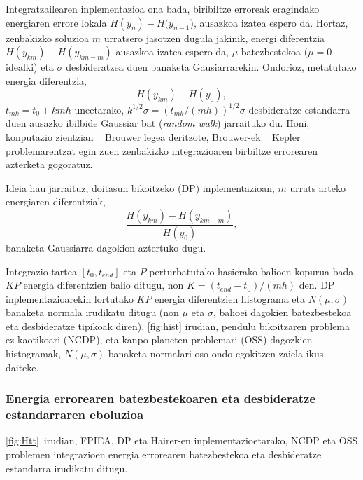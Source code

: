 Integratzailearen inplementazioa ona bada, biribiltze erroreak eragindako energiaren errore lokala $H(y_n)-H(y_{n-1}$), ausazkoa izatea espero da. Hortaz, zenbakizko soluzioa $m$ urratsero jasotzen dugula jakinik, energi diferentzia $H(y_{km})-H(y_{km-m})$ ausazkoa izatea espero da, $\mu$ batezbestekoa ($\mu=0$ idealki) eta $\sigma$ desbideratzea duen banaketa Gausiarrarekin. Ondorioz, metatutako energia diferentzia,
\begin{equation*}
H(y_{km})-H(y_0),
\end{equation*} 
$t_{mk}=t_0+kmh$ uneetarako, $k^{1/2} \sigma=(t_{mk}/(mh))^{1/2} \sigma$ desbideratze estandarra duen ausazko ibilbide Gaussiar bat (\emph{random walk}) jarraituko du. Honi, konputazio zientzian ~\cite{Grazier2005} Brouwer legea deritzote, Brouwer-ek ~\cite{Brouwer1937} Kepler problemarentzat  egin zuen zenbakizko integrazioaren birbiltze errorearen azterketa gogoratuz.

Ideia hau jarraituz, doitasun bikoitzeko (DP) inplementazioan, $m$ urrats arteko energiaren diferentziak,
\begin{equation*}
\frac{H(y_{km})-H(y_{km-m})}{H(y_0)},
\end{equation*} 
banaketa Gaussiarra dagokion aztertuko dugu.   

Integrazio tartea $[t_0, t_{end}]$  eta $P$ perturbatutako hasierako balioen kopurua bada, $KP$ energia diferentzien balio ditugu,
non $K=(t_{end}-t_0)/(mh)$ den. DP inplementazioarekin lortutako $KP$ energia diferentzien histograma eta $N(\mu,\sigma)$ banaketa normala irudikatu ditugu (non $\mu$ eta $\sigma$, balioei dagokien batezbestekoa eta desbideratze tipikoak diren). \ref{fig:hist} irudian, pendulu bikoitzaren problema ez-kaotikoari (NCDP), eta kanpo-planeten problemari (OSS) dagozkien histogramak, $N(\mu,\sigma)$ banaketa normalari oso ondo egokitzen zaiela ikus daiteke.


\subsubsection*{Energia errorearen batezbestekoaren eta desbideratze estandarraren eboluzioa}


\ref{fig:Htt}~irudian, FPIEA, DP eta Hairer-en inplementazioetarako, NCDP eta OSS problemen integrazioen energia errorearen batezbestekoa eta desbideratze estandarra irudikatu ditugu.

